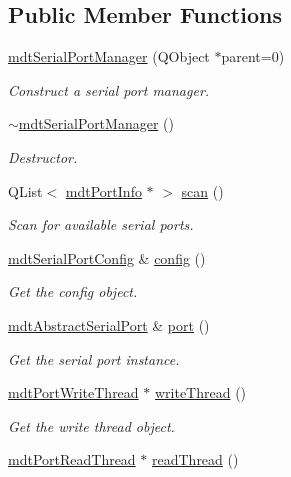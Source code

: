 \subsection*{Public Member Functions}
\begin{DoxyCompactItemize}
\item 
\hyperlink{classmdt_serial_port_manager_a6508372bcab37a73546fc2c24ee6415c}{mdtSerialPortManager} (QObject $\ast$parent=0)
\begin{DoxyCompactList}\small\item\em Construct a serial port manager. \end{DoxyCompactList}\item 
\hyperlink{classmdt_serial_port_manager_abde2c5990f3ec7daf41ebc35b4731c1d}{$\sim$mdtSerialPortManager} ()
\begin{DoxyCompactList}\small\item\em Destructor. \end{DoxyCompactList}\item 
QList$<$ \hyperlink{classmdt_port_info}{mdtPortInfo} $\ast$ $>$ \hyperlink{classmdt_serial_port_manager_a791572f869d1d605d0c4658ca4187260}{scan} ()
\begin{DoxyCompactList}\small\item\em Scan for available serial ports. \end{DoxyCompactList}\item 
\hyperlink{classmdt_serial_port_config}{mdtSerialPortConfig} \& \hyperlink{classmdt_serial_port_manager_a4b8ab7b9d53966a1887d9ce8557b8416}{config} ()
\begin{DoxyCompactList}\small\item\em Get the config object. \end{DoxyCompactList}\item 
\hyperlink{classmdt_abstract_serial_port}{mdtAbstractSerialPort} \& \hyperlink{classmdt_serial_port_manager_aa96937c2123fe4353b948b848d3e064d}{port} ()
\begin{DoxyCompactList}\small\item\em Get the serial port instance. \end{DoxyCompactList}\item 
\hypertarget{classmdt_serial_port_manager_a3a19cbca4adb7583b11a14d59e61233d}{
\hyperlink{classmdt_port_write_thread}{mdtPortWriteThread} $\ast$ \hyperlink{classmdt_serial_port_manager_a3a19cbca4adb7583b11a14d59e61233d}{writeThread} ()}
\label{classmdt_serial_port_manager_a3a19cbca4adb7583b11a14d59e61233d}

\begin{DoxyCompactList}\small\item\em Get the write thread object. \end{DoxyCompactList}\item 
\hypertarget{classmdt_serial_port_manager_aec192819e19f4679c7bba4ea37154aaf}{
\hyperlink{classmdt_port_read_thread}{mdtPortReadThread} $\ast$ \hyperlink{classmdt_serial_port_manager_aec192819e19f4679c7bba4ea37154aaf}{readThread} ()}
\label{classmdt_serial_port_manager_aec192819e19f4679c7bba4ea37154aaf}


\end{DoxyCompactItemize}
